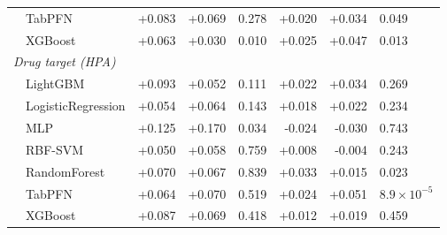 \begin{table}[ht]
\begin{tabular*}{\textwidth}{@{\extracolsep{\fill}}ll rrl rrl@{}}
  & TabPFN & +0.083 & +0.069 & 0.278 & +0.020 & +0.034 & 0.049 \\
  & XGBoost & +0.063 & +0.030 & 0.010 & +0.025 & +0.047 & 0.013 \\
\midrule
\multicolumn{8}{l}{\textit{Drug target (HPA)}} \\
  & LightGBM & +0.093 & +0.052 & 0.111 & +0.022 & +0.034 & 0.269 \\
  & LogisticRegression & +0.054 & +0.064 & 0.143 & +0.018 & +0.022 & 0.234 \\
  & MLP & +0.125 & +0.170 & 0.034 & -0.024 & -0.030 & 0.743 \\
  & RBF-SVM & +0.050 & +0.058 & 0.759 & +0.008 & -0.004 & 0.243 \\
  & RandomForest & +0.070 & +0.067 & 0.839 & +0.033 & +0.015 & 0.023 \\
  & TabPFN & +0.064 & +0.070 & 0.519 & +0.024 & +0.051 & $8.9\times10^{-5}$ \\
  & XGBoost & +0.087 & +0.069 & 0.418 & +0.012 & +0.019 & 0.459 \\
\bottomrule
\end{tabular*}
\end{table}
